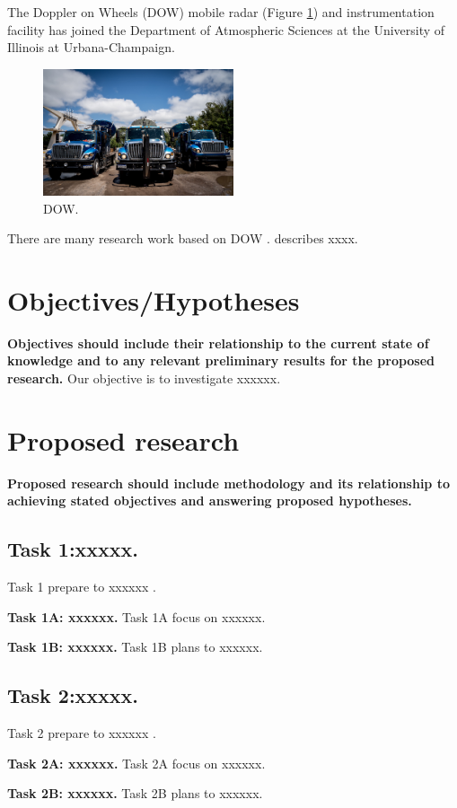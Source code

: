 \documentclass[11pt]{article} %
\begin{document}
The Doppler on Wheels (DOW) mobile radar (Figure \ref{fig:dow}) and instrumentation facility has joined the Department of Atmospheric Sciences at the University of Illinois at Urbana-Champaign.\par
\begin{figure}[h]
    \centering
    \includegraphics[width=0.5\textwidth]{DOW.jpg}
    \caption{DOW.}
    \label{fig:dow}
\end{figure}

There are many research work based on DOW \citep{wurman2021flexible,juliano2023toward}. \citet{wurman2021flexible} describes xxxx. 

\section{Objectives/Hypotheses}
\textbf{\color{red}Objectives should include their relationship to the current state of knowledge and to any relevant preliminary results for the proposed research.}
Our objective is to investigate xxxxxx. \par

\section{Proposed research}
\textbf{\color{red} Proposed research should include methodology and its relationship to achieving stated objectives and answering proposed hypotheses.}
\subsection{Task 1:xxxxx.}
Task 1 prepare to xxxxxx .\par
\vspace{\baselineskip}
\noindent \textbf{Task 1A: xxxxxx.}
Task 1A focus on xxxxxx. \par
\vspace{\baselineskip}
\noindent \textbf{Task 1B: xxxxxx.}
Task 1B plans to xxxxxx.  \par

\subsection{Task 2:xxxxx.}
Task 2 prepare to xxxxxx .\par
\vspace{\baselineskip}
\noindent \textbf{Task 2A: xxxxxx.}
Task 2A focus on xxxxxx. \par
\vspace{\baselineskip}
\noindent \textbf{Task 2B: xxxxxx.}
Task 2B plans to xxxxxx.  \par
\end{document}
